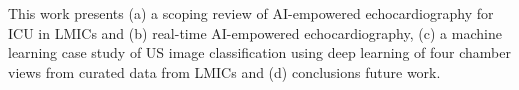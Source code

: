 \documentclass[mlabstract,twocolumn]{jmlr}
\begin{document}
This work presents (a) a scoping review of AI-empowered echocardiography for ICU in LMICs and (b) real-time AI-empowered echocardiography, (c) a machine learning case study of US image classification using deep learning of four chamber views from curated data from LMICs and (d) conclusions future work.




\end{document}

